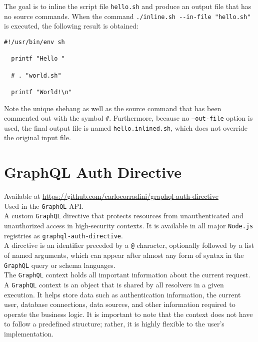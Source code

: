 The goal is to inline the script file \texttt{hello.sh} and produce an output
file that has no source commands. When the command \lstinline[language=shell,
alsoletter={.-}, morekeywords={[2]{inline.sh}}, morekeywords={[3]{--in-file}}]{./inline.sh --in-file "hello.sh"}
is executed, the following result is obtained:

\begin{lstlisting}[language=shell, alsoletter={.}, morekeywords={[2]{.}}, xleftmargin=\parindent, caption=Inlined script \texttt{hello.inlined.sh}]
  #!/usr/bin/env sh

  printf "Hello "

  # . "world.sh"

  printf "World!\n"
\end{lstlisting}

Note the unique shebang as well as the source command that has been commented
out with the symbol \texttt{\#}. Furthermore, because no \texttt{--out-file}
option is used, the final output file is named \texttt{hello.inlined.sh}, which does
not override the original input file.

\section{GraphQL Auth Directive}
\label{sec:corollary_projects_graphql_auth_diretive}

Available at \url{https://github.com/carlocorradini/graphql-auth-directive} \\ %
Used in the \texttt{GraphQL} API. \\ %
A custom \texttt{GraphQL} directive that protects resources from unauthenticated
and unauthorized access in high-security contexts. It is available in all major
\texttt{Node.js} registries as \texttt{graphql-auth-directive}. \\ %
A directive is an identifier preceded by a \texttt{@} character, optionally
followed by a list of named arguments, which can appear after almost any form of
syntax in the \texttt{GraphQL} query or schema languages\cite{graphql_directive}.
\\ %
The \texttt{GraphQL} context holds all important information about the current
request. A \texttt{GraphQL} context is an object that is shared by all resolvers
in a given execution. It helps store data such as authentication information,
the current user, database connections, data sources, and other information required
to operate the business logic\cite{graphql_context}. It is important to note that
the context does not have to follow a predefined structure; rather, it is highly
flexible to the user's implementation.


